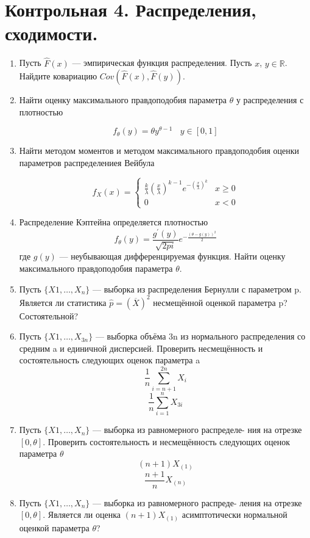 \documentclass[a4paper, 14pt]{extarticle}
\begin{document}
\section*{Контрольная 4. Распределения, сходимости.} 
\begin{enumerate}

\item Пусть $\hat F(x)$ --- эмпирическая функция распределения. Пусть $x$, $y \in \mathbb{R}$. Найдите ковариацию $Cov(\hat F(x), \hat F(y))$.

\item Найти оценку максимального правдоподобия параметра $\theta$ у распределения с плотностью

$$f_{\theta}(y) = \theta y^{\theta - 1} ~~~~ y\in[0,1]$$

\item Найти методом моментов и методом максимального правдоподобия оценки параметров распределениея Вейбула

$$f_{X}(x) = \begin{cases}
\frac{k}{\lambda}(\frac{x}{\lambda})^{k-1}e^{-(\frac{x}{\lambda})^{k}} & x\geq 0 \\
0 & x<0 
\end{cases}$$

\item Распределение Кэптейна определяется плотностью
$$f_{\theta}(y) = \frac{g^{'}(y)}{\sqrt{2pi}}e^{-\frac{(\theta - g(y))^2}{2}}$$
где $g(y)$ — неубывающая дифференцируемая функция. 
Найти оценку максимального правдоподобия параметра $\theta$.

\item Пусть  $\{X 1 ,\ldots , X_{n}\}$ — выборка из распределения Бернулли
с параметром p. Является ли статистика $\hat{p} = (\overline{X})^2$ несмещённой
оценкой параметра p? Состоятельной?

\item Пусть $\{X 1 ,\ldots , X_{3n}\}$ — выборка объёма 3n из нормального
распределения со средним a и единичной дисперсией. Проверить
несмещённость и состоятельность следующих оценок параметра a
$$\frac{1}{n}\sum_{i=n+1}^{2n}X_i$$
$$\frac{1}{n}\sum_{i=1}^{n}X_{3i}$$

\item Пусть $\{X 1 ,\ldots , X_{n}\}$ — выборка из равномерного распределе-
ния на отрезке $[0, \theta]$. Проверить состоятельность и несмещённость
следующих оценок параметра $\theta$
$$(n+1)X_{(1)}$$
$$\frac{n+1}{n}X_{(n)}$$

\item Пусть $\{X 1 ,\ldots , X_{n}\}$ — выборка из равномерного распреде-
ления на отрезке $[0, \theta]$. Является ли оценка $(n+1)X_{(1)}$ 
асимптотически нормальной оценкой параметра $\theta$?

\end{enumerate}
\end{document}
